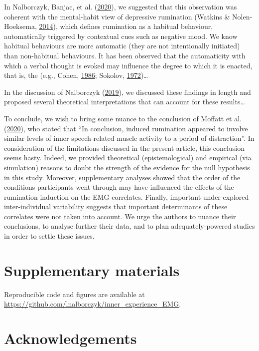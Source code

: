 \documentclass[
  english,
  man, donotrepeattitle,floatsintext]{apa6}
\begin{document}
In Nalborczyk, Banjac, et al. (\protect\hyperlink{ref-nalborczyk_dissociating_2020}{2020}), we suggested that this observation was coherent with the mental-habit view of depressive rumination (Watkins \& Nolen-Hoeksema, \protect\hyperlink{ref-watkins_habit-goal_2014}{2014}), which defines rumination as a habitual behaviour, automatically triggered by contextual cues such as negative mood. We know habitual behaviours are more automatic (they are not intentionally initiated) than non-habitual behaviours. It has been observed that the automaticity with which a verbal thought is evoked may influence the degree to which it is enacted, that is, the (e.g., Cohen, \protect\hyperlink{ref-cohen_motor_1986}{1986}; Sokolov, \protect\hyperlink{ref-sokolov_inner_1972}{1972})\ldots{}

In the discussion of Nalborczyk (\protect\hyperlink{ref-nalborczyk_understanding_2019}{2019}), we discussed these findings in length and proposed several theoretical interpretations that can account for these results\ldots{}

To conclude, we wish to bring some nuance to the conclusion of Moffatt et al. (\protect\hyperlink{ref-moffatt_inner_2020}{2020}), who stated that ``In conclusion, induced rumination appeared to involve similar levels of inner speech-related muscle activity to a period of distraction''. In consideration of the limitations discussed in the present article, this conclusion seems hasty. Indeed, we provided theoretical (epistemological) and empirical (via simulation) reasons to doubt the strength of the evidence for the null hypothesis in this study. Moreover, supplementary analyses showed that the order of the conditions participants went through may have influenced the effects of the rumination induction on the EMG correlates. Finally, important under-explored inter-individual variability suggests that important determinants of these correlates were not taken into account. We urge the authors to nuance their conclusions, to analyse further their data, and to plan adequately-powered studies in order to settle these issues.

\hypertarget{supp}{%
\section{Supplementary materials}\label{supp}}

Reproducible code and figures are available at \url{https://github.com/lnalborczyk/inner_experience_EMG}.

\hypertarget{acknowledgements}{%
\section*{Acknowledgements}\label{acknowledgements}}
\end{document}

